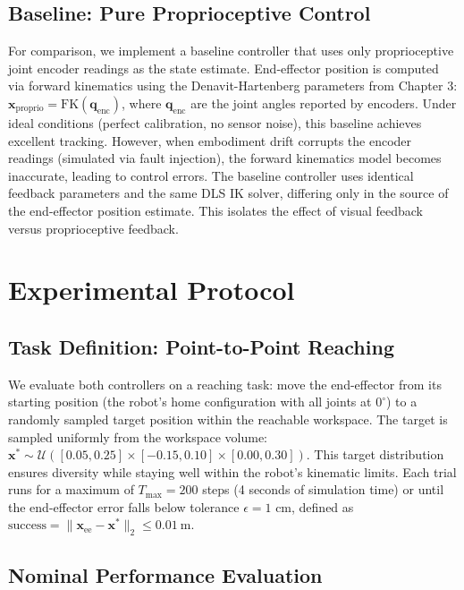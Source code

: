 \documentclass[12pt,a4paper,oneside]{report}
\begin{document}
\subsection{Baseline: Pure Proprioceptive Control}

For comparison, we implement a baseline controller that uses only proprioceptive joint encoder readings as the state estimate. End-effector position is computed via forward kinematics using the Denavit-Hartenberg parameters from Chapter 3: $\mathbf{x}_{\text{proprio}} = \text{FK}(\mathbf{q}_{\text{enc}})$, where $\mathbf{q}_{\text{enc}}$ are the joint angles reported by encoders. Under ideal conditions (perfect calibration, no sensor noise), this baseline achieves excellent tracking. However, when embodiment drift corrupts the encoder readings (simulated via fault injection), the forward kinematics model becomes inaccurate, leading to control errors. The baseline controller uses identical feedback parameters and the same DLS IK solver, differing only in the source of the end-effector position estimate. This isolates the effect of visual feedback versus proprioceptive feedback.

\section{Experimental Protocol}

\subsection{Task Definition: Point-to-Point Reaching}

We evaluate both controllers on a reaching task: move the end-effector from its starting position (the robot's home configuration with all joints at $0^\circ$) to a randomly sampled target position within the reachable workspace. The target is sampled uniformly from the workspace volume: $\mathbf{x}^* \sim \mathcal{U}([0.05, 0.25] \times [-0.15, 0.10] \times [0.00, 0.30])$. This target distribution ensures diversity while staying well within the robot's kinematic limits. Each trial runs for a maximum of $T_{\text{max}} = 200$ steps (4 seconds of simulation time) or until the end-effector error falls below tolerance $\epsilon = 1$ cm, defined as $\text{success} = \|\mathbf{x}_{\text{ee}} - \mathbf{x}^*\|_2 \leq 0.01\ \text{m}$.

\subsection{Nominal Performance Evaluation}
\end{document}
